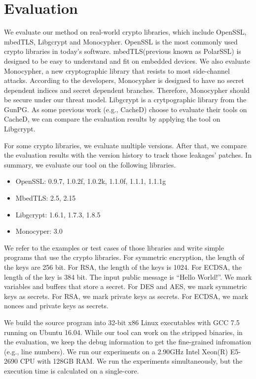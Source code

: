 \section{Evaluation}
We evaluate our method on real-world crypto libraries, which include  OpenSSL, mbedTLS, Libgcrypt and Monocypher\@. OpenSSL is the most commonly used crypto libraries in today's software. mbedTLS\@ (previous known as PolarSSL) is designed to be easy to understand and fit on embedded devices. We also evaluate Monocypher, a new cryptographic library that resists to most side-channel attacks.
According to the developers, Monocypher is designed to have no secret dependent indices and secret dependent branches. Therefore, Monocypher should be secure under our threat model. Libgcrypt is a crytpographic library from the GunPG. As some previous work (e.g., CacheD) choose to evaluate their tools on CacheD, we can compare the evaluation results by applying the tool on Libgcrypt.

For some crypto libraries, we evaluate multiple versions. After that, we compare the evaluation results with the version history to track those leakages' patches. In summary, we evaluate our tool on the following libraries.
\begin{itemize}
  \item OpenSSL: 0.9.7, 1.0.2f, 1.0.2k, 1.1.0f, 1.1.1, 1.1.1g
  \item MbedTLS: 2.5, 2.15
  \item Libgcrypt: 1.6.1, 1.7.3, 1.8.5
  \item Monocyper: 3.0
\end{itemize}

We refer to the examples or test cases of those libraries and write simple
programs that use the crypto libraries. For symmetric encryption, the length
of the keys are 256 bit. For RSA, the length of the keys is 1024. For ECDSA, the
length of the key is 384 bit. The input public message is ``Hello World!''.
We mark variables and buffers that store a secret.
For DES and AES, we mark symmetric keys as secrets.
For RSA, we mark private keys as secrets. For ECDSA,
we mark nonces and private keys as secrets.

We build the source program into 32-bit x86 Linux executables with GCC 7.5
running on Ubuntu 16.04. While our tool can work on the stripped binaries, 
in the evaluation, we keep the debug information to get the fine-grained infromation
(e.g., line numbers).
We run our experiments on a 2.90GHz Intel Xeon(R) E5-2690 CPU with 128GB
RAM. We run the experiments simultaneously, but the execution time is calculated on a single-core.

